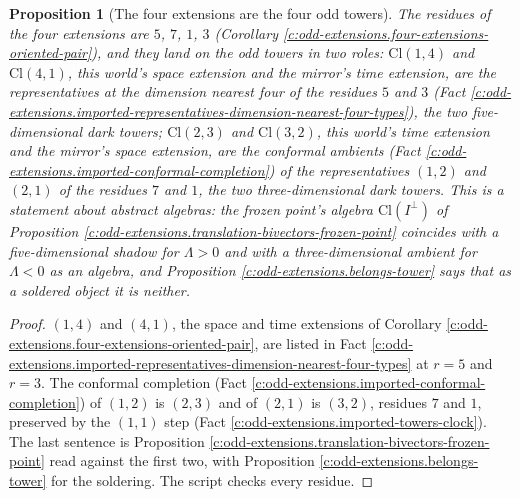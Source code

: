 \documentclass[11pt]{article}
\newtheorem{proposition}[theorem]{Proposition}
\theoremstyle{definition}
\theoremstyle{plain}
\newcommand{\changedmark}[2]{\marginpar{\raggedright\scriptsize\color{#1}#2}}
\providecommand{\Cl}{}\renewcommand{\Cl}{\mathrm{Cl}}
\begin{document}
\begin{proposition}[The four extensions are the four odd towers]\label{c:odd-extensions.four-extensions-are-four-odd-towers}
\changedmark{gray}{reworded}
The residues of the four extensions are $5$, $7$, $1$, $3$ (Corollary \ref{c:odd-extensions.four-extensions-oriented-pair}), and they land on the odd towers in two roles: $\Cl(1,4)$ and $\Cl(4,1)$, this world's space extension and the mirror's time extension, are the representatives at the dimension nearest four of the residues $5$ and $3$ (Fact \ref{c:odd-extensions.imported-representatives-dimension-nearest-four-types}), the two five-dimensional dark towers; $\Cl(2,3)$ and $\Cl(3,2)$, this world's time extension and the mirror's space extension, are the conformal ambients (Fact \ref{c:odd-extensions.imported-conformal-completion}) of the representatives $(1,2)$ and $(2,1)$ of the residues $7$ and $1$, the two three-dimensional dark towers. This is a statement about abstract algebras: the frozen point's algebra $\Cl(I^{\perp})$ of Proposition \ref{c:odd-extensions.translation-bivectors-frozen-point} coincides with a five-dimensional shadow for $\Lambda > 0$ and with a three-dimensional ambient for $\Lambda < 0$ as an algebra, and Proposition \ref{c:odd-extensions.belongs-tower} says that as a soldered object it is neither.
\end{proposition}
\begin{proof}
$(1,4)$ and $(4,1)$, the space and time extensions of Corollary \ref{c:odd-extensions.four-extensions-oriented-pair}, are listed in Fact \ref{c:odd-extensions.imported-representatives-dimension-nearest-four-types} at $r = 5$ and $r = 3$. The conformal completion (Fact \ref{c:odd-extensions.imported-conformal-completion}) of $(1,2)$ is $(2,3)$ and of $(2,1)$ is $(3,2)$, residues $7$ and $1$, preserved by the $(1,1)$ step (Fact \ref{c:odd-extensions.imported-towers-clock}). The last sentence is Proposition \ref{c:odd-extensions.translation-bivectors-frozen-point} read against the first two, with Proposition \ref{c:odd-extensions.belongs-tower} for the soldering. The script checks every residue.

\end{proof}
\end{document}
